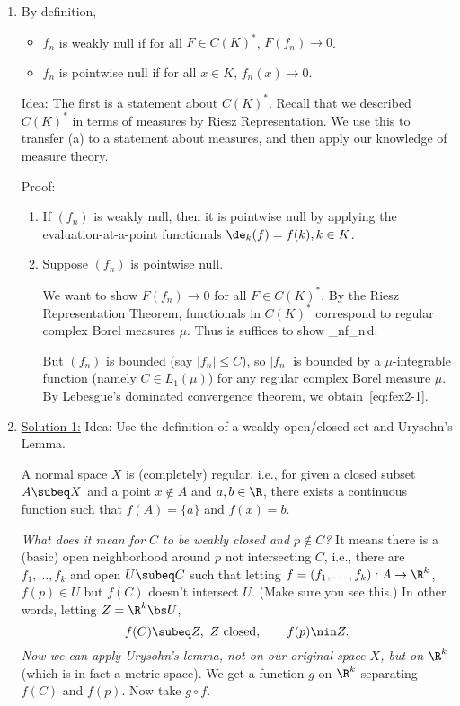\begin{enumerate}
\item 
By definition,
\begin{itemize}
\item
$f_n$ is weakly null if for all $F\in C(K)^*$, $F(f_n)\to 0$.
\item
$f_n$ is pointwise null if for all $x\in K$, $f_n(x)\to 0$.
\end{itemize}
Idea: The first is a statement about $C(K)^*$. Recall that we described $C(K)^*$ in terms of measures by Riesz Representation. We use this to transfer (a) to a statement about measures, and then apply our knowledge of measure theory.


Proof:
\begin{enumerate}
\item
If $(f_n)$ is weakly null, then it is pointwise null by applying the evaluation-at-a-point functionals $\de_k(f)=f(k),k\in K$.
\item
Suppose $(f_n)$ is pointwise null. 

We want to show $F(f_n)\to 0$ for all $F\in C(K)^*$. By the Riesz Representation Theorem, functionals in $C(K)^*$ correspond to regular complex Borel measures $\mu$. Thus is suffices to show
\lim_{n\to \iy}\int f_n\,d\mu.
\eeq

But $(f_n)$ is bounded (say $|f_n|\le C$), so $|f_n|$ is bounded by a $\mu$-integrable function (namely $C\in L_1(\mu)$) for any regular complex Borel measure $\mu$. 
By Lebesgue's dominated convergence theorem, we obtain~\eqref{eq:fex2-1}.
\end{enumerate}

\item 
\ul{Solution 1:} Idea: Use the definition of a weakly open/closed set and Urysohn's Lemma.
\begin{lem*}
A normal space $X$ is (completely) regular, i.e., for given a closed subset $A\subeq X$ and a point $x\nin A$ and $a,b\in \R$, there exists a continuous function such that $f(A)=\{a\}$ and $f(x)=b$. 
\end{lem*}
{\it What does it mean for $C$ to be weakly closed and $p\nin C$?} It means there is a (basic) open neighborhood around $p$ not intersecting $C$, i.e., there are $f_1,\ldots, f_k$ and open $U\subeq C$ such that letting $f=(f_1,\ldots, f_k):A\to \R^k$, $f(p)\in U$ but $f(C)$ doesn't intersect $U$. (Make sure you see this.) In other words, letting $Z=\R^k\bs U$, 
\[
f(C)\subeq Z, \text{ $Z$ closed},\qquad f(p)\nin Z.
\]
{\it Now we can apply Urysohn's lemma, not on our original space $X$, but on $\R^k$} (which is in fact a metric space). We get a function $g$ on $\R^k$ separating $f(C)$ and $f(p)$. Now take $g\circ f$.


\end{enumerate}
